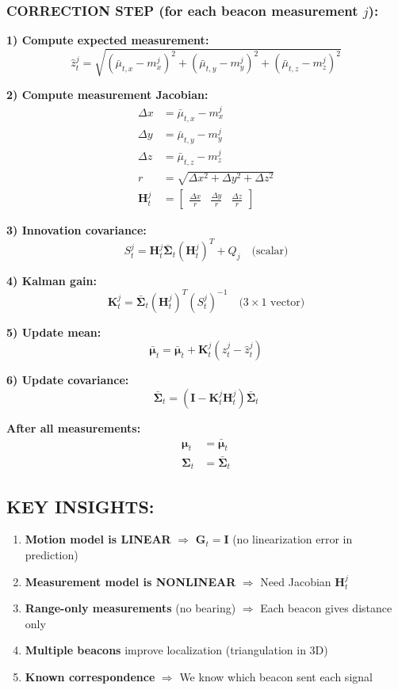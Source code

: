 \documentclass[14pt,letterpaper]{article}
\theoremstyle{definition}
\begin{document}
\subsubsection*{CORRECTION STEP (for each beacon measurement $j$):}

\textbf{1) Compute expected measurement:}
\[
\hat{z}_t^j = \sqrt{(\bar{\mu}_{t,x} - m_x^j)^2 + (\bar{\mu}_{t,y} - m_y^j)^2 + (\bar{\mu}_{t,z} - m_z^j)^2}
\]

\textbf{2) Compute measurement Jacobian:}
\begin{align*}
\Delta x &= \bar{\mu}_{t,x} - m_x^j \\
\Delta y &= \bar{\mu}_{t,y} - m_y^j \\
\Delta z &= \bar{\mu}_{t,z} - m_z^j \\
r &= \sqrt{\Delta x^2 + \Delta y^2 + \Delta z^2} \\
\mathbf{H}_t^j &= \begin{bmatrix} \frac{\Delta x}{r} & \frac{\Delta y}{r} & \frac{\Delta z}{r} \end{bmatrix}
\end{align*}

\textbf{3) Innovation covariance:}
\[
S_t^j = \mathbf{H}_t^j \bar{\boldsymbol{\Sigma}}_t (\mathbf{H}_t^j)^T + Q_j \quad \text{(scalar)}
\]

\textbf{4) Kalman gain:}
\[
\mathbf{K}_t^j = \bar{\boldsymbol{\Sigma}}_t (\mathbf{H}_t^j)^T (S_t^j)^{-1} \quad \text{($3 \times 1$ vector)}
\]

\textbf{5) Update mean:}
\[
\bar{\boldsymbol{\mu}}_t = \bar{\boldsymbol{\mu}}_t + \mathbf{K}_t^j (z_t^j - \hat{z}_t^j)
\]

\textbf{6) Update covariance:}
\[
\bar{\boldsymbol{\Sigma}}_t = (\mathbf{I} - \mathbf{K}_t^j \mathbf{H}_t^j) \bar{\boldsymbol{\Sigma}}_t
\]

\textbf{After all measurements:}
\begin{align*}
\boldsymbol{\mu}_t &= \bar{\boldsymbol{\mu}}_t \\
\boldsymbol{\Sigma}_t &= \bar{\boldsymbol{\Sigma}}_t
\end{align*}

\subsection*{KEY INSIGHTS:}
\begin{enumerate}
\item \textbf{Motion model is LINEAR} $\Rightarrow$ $\mathbf{G}_t = \mathbf{I}$ (no linearization error in prediction)
\item \textbf{Measurement model is NONLINEAR} $\Rightarrow$ Need Jacobian $\mathbf{H}_t^j$
\item \textbf{Range-only measurements} (no bearing) $\Rightarrow$ Each beacon gives distance only
\item \textbf{Multiple beacons} improve localization (triangulation in 3D)
\item \textbf{Known correspondence} $\Rightarrow$ We know which beacon sent each signal
\end{enumerate}
\end{document}
